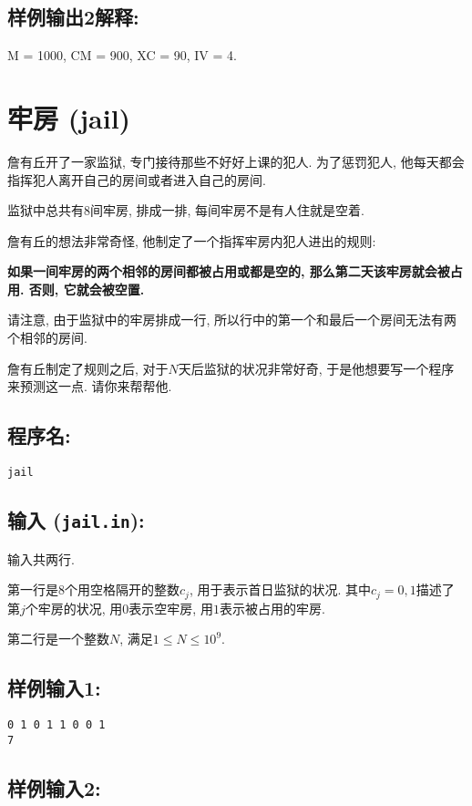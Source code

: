 \documentclass{article}
\begin{document}
\subsection*{样例输出2解释:}

M = 1000, CM = 900, XC = 90, IV = 4.

\section{牢房 (jail)}
\label{sec:jail}

詹有丘开了一家监狱, 专门接待那些不好好上课的犯人.
为了惩罚犯人, 他每天都会指挥犯人离开自己的房间或者进入自己的房间.

监狱中总共有8间牢房, 排成一排, 每间牢房不是有人住就是空着.

詹有丘的想法非常奇怪, 他制定了一个指挥牢房内犯人进出的规则:

\textbf{如果一间牢房的两个相邻的房间都被占用或都是空的, 那么第二天该牢房就会被占用.
否则, 它就会被空置.}

请注意, 由于监狱中的牢房排成一行, 所以行中的第一个和最后一个房间无法有两个相邻的房间.

詹有丘制定了规则之后, 对于$N$天后监狱的状况非常好奇, 于是他想要写一个程序来预测这一点.
请你来帮帮他.

\subsection*{程序名:}

\texttt{jail}

\subsection*{输入 (\texttt{jail.in}):}

输入共两行.

第一行是8个用空格隔开的整数$c_j$, 用于表示首日监狱的状况.
其中$c_j=0,1$描述了第$j$个牢房的状况, 用$0$表示空牢房, 用$1$表示被占用的牢房.

第二行是一个整数$N$, 满足$1\le N\le 10^9$.

\subsection*{样例输入1:}

\begin{verbatim}
0 1 0 1 1 0 0 1
7
\end{verbatim}

\subsection*{样例输入2:}
\end{document}
